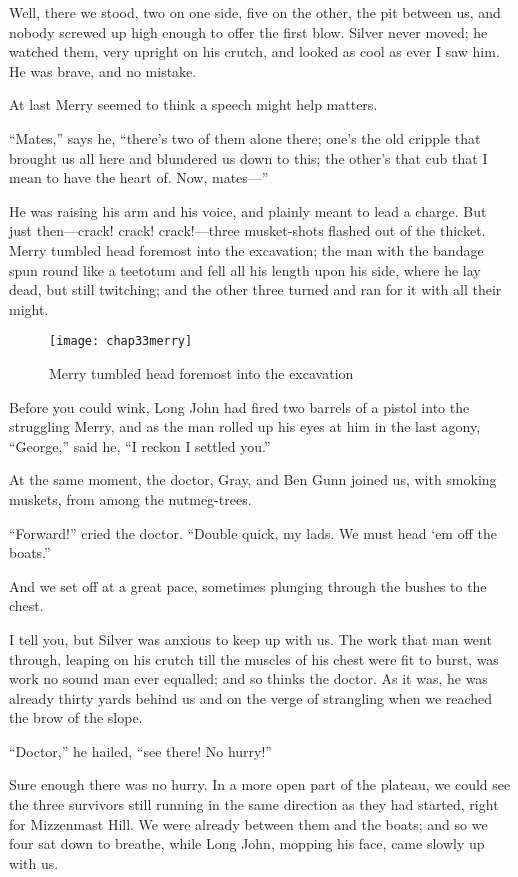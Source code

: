 Well, there we stood, two on one side, five on the other, the pit between us, and nobody screwed up high enough to offer the first blow. Silver never moved; he watched them, very upright on his crutch, and looked as cool as ever I saw him. He was brave, and no mistake.

At last Merry seemed to think a speech might help matters.

\enquote{Mates,} says he, \enquote{there’s two of them alone there; one’s the old cripple that brought us all here and blundered us down to this; the other’s that cub that I mean to have the heart of. Now, mates---}

He was raising his arm and his voice, and plainly meant to lead a charge. But just then---crack! crack! crack!---three musket-shots flashed out of the thicket. Merry tumbled head foremost into the excavation; the man with the bandage spun round like a teetotum and fell all his length upon his side, where he lay dead, but still twitching; and the other three turned and ran for it with all their might.

 \begin{figure}[p]
\centering
\texttt{[image: chap33merry]}
\caption{Merry tumbled head foremost into the excavation}
\end{figure}  

Before you could wink, Long John had fired two barrels of a pistol into the struggling Merry, and as the man rolled up his eyes at him in the last agony, \enquote{George,} said he, \enquote{I reckon I settled you.}

At the same moment, the doctor, Gray, and Ben Gunn joined us, with smoking muskets, from among the nutmeg-trees.

\enquote{Forward!} cried the doctor. \enquote{Double quick, my lads. We must head `em off the boats.}

And we set off at a great pace, sometimes plunging through the bushes to the chest.

I tell you, but Silver was anxious to keep up with us. The work that man went through, leaping on his crutch till the muscles of his chest were fit to burst, was work no sound man ever equalled; and so thinks the doctor. As it was, he was already thirty yards behind us and on the verge of strangling when we reached the brow of the slope.

\enquote{Doctor,} he hailed, \enquote{see there! No hurry!}

Sure enough there was no hurry. In a more open part of the plateau, we could see the three survivors still running in the same direction as they had started, right for Mizzenmast Hill. We were already between them and the boats; and so we four sat down to breathe, while Long John, mopping his face, came slowly up with us.

